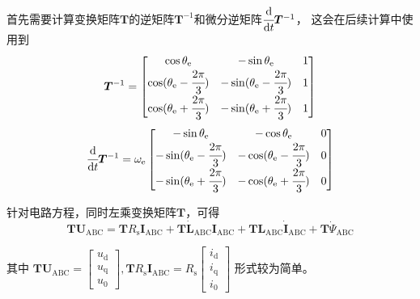 首先需要计算变换矩阵\(\bm{T}\)的逆矩阵\(\bm{T}^{-1}\)和微分逆矩阵\(\cfrac{\mathrm{d}}{\mathrm{d} t}\bm{T}^{-1}\)，
这会在后续计算中使用到
\begin{equation}
    \bm{T}^{-1}
    =
    \begin{bmatrix}\cos\theta_{\mathrm{e}}&-\sin\theta_{\mathrm{e}}&1\\
        \cos(\theta_{\mathrm{e}}-\cfrac{2\pi}{3})&-\sin(\theta_{\mathrm{e}}-\cfrac{2\pi}{3})&1\\
        \cos(\theta_{\mathrm{e}}+\cfrac{2\pi}{3})&-\sin(\theta_{\mathrm{e}}+\cfrac{2\pi}{3})&1
    \end{bmatrix}
    \label{eq:克拉克-帕克变换矩阵逆矩阵}
\end{equation}
\begin{equation}
    \cfrac{\mathrm{d}}{\mathrm{d} t}\bm{T}^{-1}
    =\omega_{\mathrm{e}}\begin{bmatrix}-\sin\theta_{\mathrm{e}}&-\cos\theta_{\mathrm{e}}&0\\
        -\sin(\theta_{\mathrm{e}}-\cfrac{2\pi}{3})&-\cos(\theta_{\mathrm{e}}-\cfrac{2\pi}{3})&0\\
        -\sin(\theta_{\mathrm{e}}+\cfrac{2\pi}{3})&-\cos(\theta_{\mathrm{e}}+\cfrac{2\pi}{3})&0
    \end{bmatrix}
    \label{eq:克拉克-帕克变换矩阵微分逆矩阵}
\end{equation}

针对电路方程，同时左乘变换矩阵\(\bm{T}\)，可得
\begin{equation*}
    \bm{T}\bm{U}_{\mathrm{ABC}}
    =\bm{T}R_{\mathrm{s}}\bm{I}_{\mathrm{ABC}}+
    \bm{T}{\dot{\bm{L}}_{\mathrm{ABC}}\bm{I}_{\mathrm{ABC}}+
    \bm{T}\bm{L}_{\mathrm{ABC}}\dot{\bm{I}}_{\mathrm{ABC}}}+
    \bm{T}{\dot{\bm{\varPsi}}_{\mathrm{ABC}}}
\end{equation*}

其中
\(
\bm{T}\bm{U}_{\mathrm{ABC}}
=\begin{bmatrix}u_{\mathrm{d}}\\u_{\mathrm{q}}\\u_{\mathrm{0}}\end{bmatrix}
,\bm{T}R_{\mathrm{s}}\bm{I}_{\mathrm{ABC}}=R_{\mathrm{s}}\begin{bmatrix}i_{\mathrm{d}}\\i_{\mathrm{q}}\\i_{\mathrm{0}}\end{bmatrix}
\)
形式较为简单。

